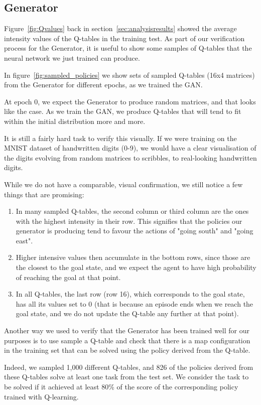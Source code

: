 \subsection{Generator}
Figure~\ref{fig:Qvalues} back in section~\ref{sec:analysisresults} showed the average intensity values of the Q-tables in the training test. As part of our verification process for the Generator, it is useful to show some samples of Q-tables that the neural network we just trained can produce.

In figure~\ref{fig:sampled_policies} we show sets of sampled Q-tables (16x4 matrices) from the Generator for different epochs, as we trained the GAN.

At epoch 0, we expect the Generator to produce random matrices, and that looks like the case. As we train the GAN, we produce Q-tables that will tend to fit within the initial distribution more and more.

It is still a fairly hard task to verify this visually. If we were training on the MNIST dataset of handwritten digits (0-9), we would have a clear visualisation of the digits evolving from random matrices to scribbles, to real-looking handwritten digits.

While we do not have a comparable, visual confirmation, we still notice a few things that are promising:
\begin{enumerate}
	\item In many sampled Q-tables, the second column or third column are the ones with the highest intensity in their row. This signifies that the policies our generator is producing tend to favour the actions of "going south" and "going east".
	\item Higher intensive values then accumulate in the bottom rows, since those are the closest to the goal state, and we expect the agent to have high probability of reaching the goal at that point.
	\item In all Q-tables, the last row (row 16), which corresponds to the goal state, has all its values set to 0 (that is because an episode ends when we reach the goal state, and we do not update the Q-table any further at that point).
\end{enumerate}

Another way we used to verify that the Generator has been trained well for our purposes is to use sample a Q-table and check that there is a map configuration in the training set that can be solved using the policy derived from the Q-table.

Indeed, we sampled 1,000 different Q-tables, and 826 of the policies derived from these Q-tables solve at least one task from the test set. We consider the task to be solved if it achieved at least 80\% of the score of the corresponding policy trained with Q-learning.

